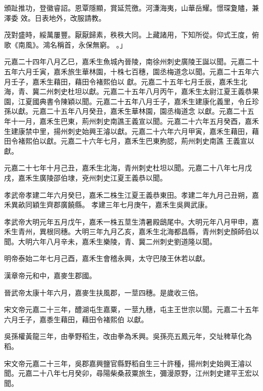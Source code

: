 \begin{pinyinscope}
頒趾推功，登徽睿詔。恩覃隱顯，賞延荒徼。河溓海夷，山華岳耀。憬琛夐贐，兼澤委
 效。日表地外，改服請教。


茂對盛時，綏萬屢豐。厭厭歸素，秩秩大同。上藏諸用，下知所從。仰式王度，俯歌《南風》。鴻名稱首，永保無窮。
 。」



 元嘉二十四年八月乙巳，嘉禾生魚城內晉陵，南徐州刺史廣陵王誕以聞。元嘉二十五年六月壬寅，嘉禾旅生華林園，十株七百穗，園丞梅道念以聞。元嘉二十五年六月壬子，嘉禾生藉田，藉田令褚熙伯以
 獻。元嘉二十五年七月壬辰，嘉禾生北海，青、冀二州刺史杜坦以獻。元嘉二十五年八月丙午，嘉禾生太尉江夏王義恭果園，江夏國典書令陳穎以聞。元嘉二十五年八月壬子，嘉禾生建康化義里，令丘珍孫以獻。元嘉二十五年八月癸丑，嘉禾生華林園，園丞梅道念
 以獻。元嘉二十五年十一月，嘉禾生巴東，荊州刺史南譙王義宣以聞。元嘉二十六年五月癸酉，嘉禾生建康禁中里，揚州刺史始興王濬以獻。元嘉二十六年六月甲寅，嘉禾生藉田，藉田令褚熙伯以獻。元嘉二十六年七月，嘉禾生巴東朐䏰，荊州刺史南譙
 王義宣以獻。



 元嘉二十七年十月己丑，嘉禾生北海，青州刺史杜坦以聞。元嘉二十八年七月戊戌，嘉禾生廣陵邵伯埭，兗州刺史江夏王義恭以聞。



 孝武帝孝建二年六月癸巳，嘉禾二株生江夏王義恭東田。孝建二年九月己丑朔，嘉禾異畝同穎生齊郡廣饒縣。
 孝建三年七月庚午，嘉禾生吳興武康。



 孝武帝大明元年五月戊午，嘉禾一株五莖生清暑殿鴟尾中。大明元年八月甲申，嘉禾生青州，異根同穗。大明三年九月乙亥，嘉禾生北海都昌縣，青州刺史顏師伯以聞。大明六年八月辛未，嘉禾生樂陵，青、冀二州刺史劉道隆以聞。



 明帝泰始二年七月己酉，嘉禾生會稽永興，太守巴陵王休若以獻。



 漢章帝元和中，嘉麥生郡國。



 晉武帝太康十年六月，嘉麥生扶風郡，一莖四穗。是歲收三倍。



 宋文帝元嘉二十三年，醴湖屯生嘉粟，一莖九穗，屯主王世宗以聞。元嘉二十五年六月壬子，嘉黍生藉田，藉田令褚熙伯
 以獻。



 吳孫權黃龍三年，由拳野稻生，改由拳為禾興。吳孫亮五鳳元年，交址稗草化為稻。



 宋文帝元嘉二十三年，吳郡嘉興鹽官縣野稻自生三十許種，揚州刺史始興王濬以聞。元嘉二十八年七月癸卯，尋陽柴桑菽粟旅生，彌漫原野，江州刺史建平王宏以聞。




\end{pinyinscope}

